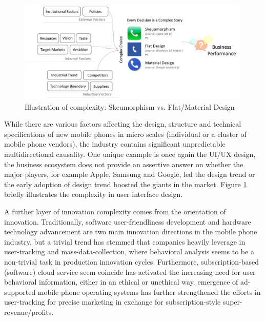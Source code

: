 \documentclass[utf8,english]{gradu3}
\begin{document}
\begin{figure}[htb]
    \centering
    \includegraphics[width=0.99\textwidth]{design.png}
    \caption{Illustration of complexity: Skeumorphism vs. Flat/Material Design}
    \label{fig:design}
\end{figure}

While there are various factors affecting the design, structure and technical specifications of new mobile phones in micro scales (individual or a cluster of mobile phone vendors), the industry contains significant unpredictable multidirectional causality. One unique example is once again the UI/UX design, the business ecosystem does not provide an assertive answer on whether the major players, for example Apple, Samsung and Google, led the design trend or the early adoption of design trend boosted the giants in the market. Figure \ref{fig:design} briefly illustrates the complexity in user interface design.

A further layer of innovation complexity comes from the orientation of innovation. Traditionally, software user-friendliness development and hardware technology advancement are two main innovation directions in the mobile phone industry, but a trivial trend has stemmed that companies heavily leverage in user-tracking and mass-data-collection, where behavioral analysis seems to be a non-trivial task in production innovation cycles. Furthermore, subscription-based (software) cloud service seem coincide has activated the increasing need for user behavioral information, either in an ethical or unethical way. emergence of ad-supported mobile phone operating systems has further strengthened the efforts in user-tracking for precise marketing in exchange for subscription-style super-revenue/profits. 
\end{document}

